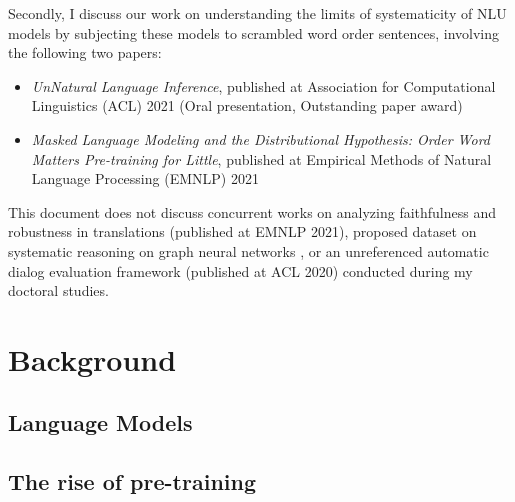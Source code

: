 \documentclass[12pt]{article}
\begin{document}
Secondly, I discuss our work on understanding the limits of systematicity of NLU models by subjecting these models to scrambled word order sentences, involving the following two papers:

\begin{itemize}
  \item \textit{UnNatural Language Inference}, published at Association for Computational Linguistics (ACL) 2021 (Oral presentation, Outstanding paper award) \cite{sinha2021}
  \item \textit{Masked Language Modeling and the Distributional Hypothesis: Order Word Matters Pre-training for Little}, published at Empirical Methods of Natural Language Processing (EMNLP) 2021 \cite{sinha2021a}
\end{itemize}

This document does not discuss concurrent works on analyzing faithfulness and robustness in translations \cite{parthasarathi2021a} (published at EMNLP 2021), proposed dataset on systematic reasoning on graph neural networks \cite{sinha2020c}, or an unreferenced automatic dialog evaluation framework \cite{sinha2020d} (published at ACL 2020) conducted during my doctoral studies.






\section{Background}


\subsection{Language Models}



\subsection{The rise of pre-training}
\end{document}
